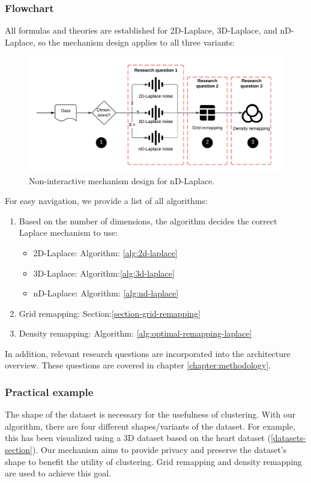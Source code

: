 \subsubsection{Flowchart}
All formulas and theories are established for 2D-Laplace, 3D-Laplace, and nD-Laplace, so the mechanism design applies to all three variants:
\begin{figure}[h]
  \includegraphics[width=1.1\textwidth]{TheorethicalFramework//ND-Laplace//Images/overview.png}
  \caption{Non-interactive mechanism design for nD-Laplace.}
  \label{fig:final-mechanism-design}
\end{figure}
For easy navigation, we provide a list of all algorithms:
\begin{enumerate}
  \item Based on the number of dimensions, the algorithm decides the correct Laplace mechanism to use:
        \begin{itemize}
          \item 2D-Laplace:  Algorithm: \ref{alg:2d-laplace}
          \item 3D-Laplace:  Algorithm:\ref{alg:3d-laplace}
          \item nD-Laplace: Algorithm: \ref{alg:nd-laplace}
        \end{itemize}
  \item Grid remapping: Section:\ref{section-grid-remapping}
  \item Density remapping: Algorithm: \ref{alg:optimal-remapping-laplace}
\end{enumerate}
In addition, relevant research questions are incorporated into the architecture overview.
These questions are covered in chapter \ref{chapter:methodology}.
\subsubsection{Practical example}
The shape of the dataset is necessary for the usefulness of clustering.
With our algorithm, there are four different shapes/variants of the dataset.
For example, this has been visualized using a 3D dataset based on the heart dataset (\ref{datasets-section}).
Our mechanism aims to provide privacy and preserve the dataset's shape to benefit the utility of clustering.
Grid remapping and density remapping are used to achieve this goal.

